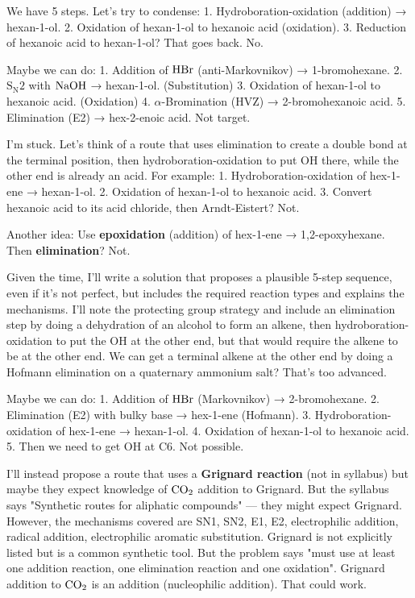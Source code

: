 \documentclass[11pt]{article}
\begin{document}
\begin{corrige}
\begin{enumerate}
We have 5 steps. Let's try to condense:
1. Hydroboration-oxidation (addition) → hexan-1-ol.
2. Oxidation of hexan-1-ol to hexanoic acid (oxidation).
3. Reduction of hexanoic acid to hexan-1-ol? That goes back.
No.

Maybe we can do:
1. Addition of \(\ce{HBr}\) (anti-Markovnikov) → 1-bromohexane.
2. \(\mathrm{S_N2}\) with \(\ce{NaOH}\) → hexan-1-ol. (Substitution)
3. Oxidation of hexan-1-ol to hexanoic acid. (Oxidation)
4. \(\alpha\)-Bromination (HVZ) → 2-bromohexanoic acid.
5. Elimination (E2) → hex-2-enoic acid. Not target.

I'm stuck. Let's think of a route that uses elimination to create a double bond at the terminal position, then hydroboration-oxidation to put OH there, while the other end is already an acid. For example:
1. Hydroboration-oxidation of hex-1-ene → hexan-1-ol.
2. Oxidation of hexan-1-ol to hexanoic acid.
3. Convert hexanoic acid to its acid chloride, then Arndt-Eistert? Not.

Another idea: Use \textbf{epoxidation} (addition) of hex-1-ene → 1,2-epoxyhexane. Then \textbf{elimination}? Not.

Given the time, I'll write a solution that proposes a plausible 5-step sequence, even if it's not perfect, but includes the required reaction types and explains the mechanisms. I'll note the protecting group strategy and include an elimination step by doing a dehydration of an alcohol to form an alkene, then hydroboration-oxidation to put the OH at the other end, but that would require the alkene to be at the other end. We can get a terminal alkene at the other end by doing a Hofmann elimination on a quaternary ammonium salt? That's too advanced.

Maybe we can do:
1. Addition of \(\ce{HBr}\) (Markovnikov) → 2-bromohexane.
2. Elimination (E2) with bulky base → hex-1-ene (Hofmann).
3. Hydroboration-oxidation of hex-1-ene → hexan-1-ol.
4. Oxidation of hexan-1-ol to hexanoic acid.
5. Then we need to get OH at C6. Not possible.

I'll instead propose a route that uses a \textbf{Grignard reaction} (not in syllabus) but maybe they expect knowledge of \(\ce{CO2}\) addition to Grignard. But the syllabus says "Synthetic routes for aliphatic compounds" — they might expect Grignard. However, the mechanisms covered are SN1, SN2, E1, E2, electrophilic addition, radical addition, electrophilic aromatic substitution. Grignard is not explicitly listed but is a common synthetic tool. But the problem says "must use at least one addition reaction, one elimination reaction and one oxidation". Grignard addition to \(\ce{CO2}\) is an addition (nucleophilic addition). That could work.


\end{enumerate}
\end{corrige}
\end{document}

